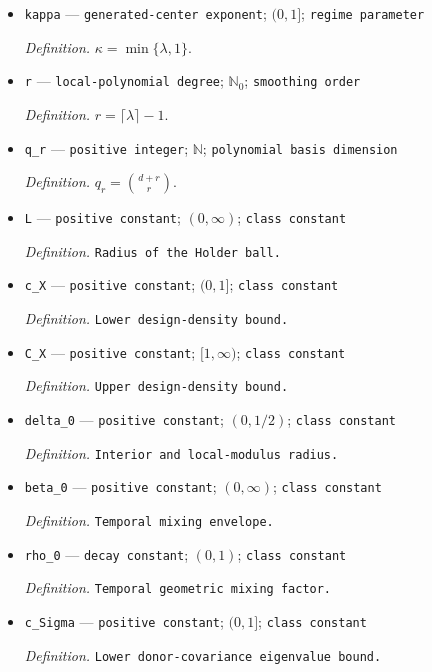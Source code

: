 \documentclass{article}
\begin{document}
\begin{itemize}
  \item \texttt{kappa} --- \texttt{generated-\allowbreak{}center exponent}; \((0,1]\); \texttt{regime parameter}
  \par\smallskip\noindent\emph{Definition.} \(\kappa=\min\{\lambda,1\}\).
  \item \texttt{r} --- \texttt{local-\allowbreak{}polynomial degree}; \(\mathbb N_0\); \texttt{smoothing order}
  \par\smallskip\noindent\emph{Definition.} \(r=\lceil\lambda\rceil-1\).
  \item \texttt{q\_\allowbreak{}r} --- \texttt{positive integer}; \(\mathbb N\); \texttt{polynomial basis dimension}
  \par\smallskip\noindent\emph{Definition.} \(q_r=\binom{d+r}{r}\).
  \item \texttt{L} --- \texttt{positive constant}; \((0,\infty)\); \texttt{class constant}
  \par\smallskip\noindent\emph{Definition.} \texttt{Radius of the Holder ball.}
  \item \texttt{c\_\allowbreak{}X} --- \texttt{positive constant}; \((0,1]\); \texttt{class constant}
  \par\smallskip\noindent\emph{Definition.} \texttt{Lower design-\allowbreak{}density bound.}
  \item \texttt{C\_\allowbreak{}X} --- \texttt{positive constant}; \([1,\infty)\); \texttt{class constant}
  \par\smallskip\noindent\emph{Definition.} \texttt{Upper design-\allowbreak{}density bound.}
  \item \texttt{delta\_\allowbreak{}0} --- \texttt{positive constant}; \((0,1/2)\); \texttt{class constant}
  \par\smallskip\noindent\emph{Definition.} \texttt{Interior and local-\allowbreak{}modulus radius.}
  \item \texttt{beta\_\allowbreak{}0} --- \texttt{positive constant}; \((0,\infty)\); \texttt{class constant}
  \par\smallskip\noindent\emph{Definition.} \texttt{Temporal mixing envelope.}
  \item \texttt{rho\_\allowbreak{}0} --- \texttt{decay constant}; \((0,1)\); \texttt{class constant}
  \par\smallskip\noindent\emph{Definition.} \texttt{Temporal geometric mixing factor.}
  \item \texttt{c\_\allowbreak{}Sigma} --- \texttt{positive constant}; \((0,1]\); \texttt{class constant}
  \par\smallskip\noindent\emph{Definition.} \texttt{Lower donor-\allowbreak{}covariance eigenvalue bound.}

\end{itemize}
\end{document}
